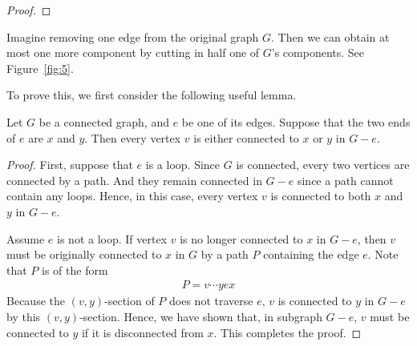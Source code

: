 \documentclass[thmcnt=section, 12pt, color=cyan]{my-elegantbook}
\begin{document}
\begin{proof}
\end{proof}


Imagine removing one edge from the original graph $G$.
Then we can obtain at most one more component 
by cutting in half one of $G$'s components.
See Figure~\ref{fig:5}.

To prove this, we first consider
the following useful lemma.

\begin{lemma} \label{lem:1}
	Let $G$ be a connected graph, 
	and $e$ be one of its edges.
	Suppose that the two ends of $e$ are $x$ and $y$.
	Then every vertex $v$ is either connected to $x$
	or $y$ in $G-e$.
\end{lemma}

\begin{proof}
	First, suppose that $e$ is a loop.
	Since $G$ is connected, 
	every two vertices are connected by a path.
	And they remain connected in $G-e$ 
	since a path cannot contain any loops.
	Hence, in this case, every vertex $v$ 
	is connected to both $x$ and $y$ in $G-e$.

	Assume $e$ is not a loop. 
	If vertex $v$ is no longer connected to $x$ in $G-e$,
	then $v$ must be originally connected to $x$
	in $G$
	by a path $P$ containing the edge $e$.
	Note that $P$ is of the form 
	\begin{align*}
		P = v \cdots y e x
	\end{align*}
	Because the $(v,y)$-section of $P$ does not traverse $e$,
	$v$ is connected to $y$ in $G-e$ by this $(v,y)$-section.
	Hence, we have shown that, 
	in subgraph $G-e$, 
	$v$ must be connected to $y$ 
	if it is disconnected from $x$.
	This completes the proof.
\end{proof}
\end{document}
